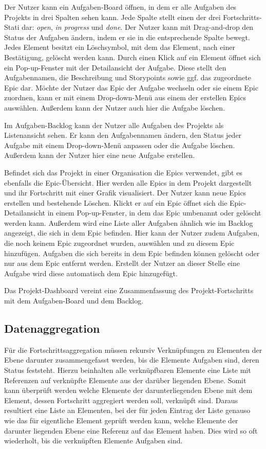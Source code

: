 Der Nutzer kann ein Aufgaben-Board öffnen, in dem er alle Aufgaben des Projekts in drei Spalten sehen kann. Jede Spalte stellt einen der drei Fortschritts-Stati dar: \emph{open}, \emph{in progress} und \emph{done}. Der Nutzer kann mit Drag-and-drop den Status der Aufgaben ändern, indem er sie in die entsprechende Spalte bewegt. Jedes Element besitzt ein Löschsymbol, mit dem das Element, nach einer Bestätigung, gelöscht werden kann. Durch einen Klick auf ein Element öffnet sich ein Pop-up-Fenster mit der Detailansicht der Aufgabe. Diese stellt den Aufgabennamen, die Beschreibung und Storypoints sowie ggf. das zugeordnete Epic dar. Möchte der Nutzer das Epic der Aufgabe wechseln oder sie einem Epic zuordnen, kann er mit einem Drop-down-Menü aus einem der erstellen Epics auswählen. Außerdem kann der Nutzer auch hier die Aufgabe löschen.

Im Aufgaben-Backlog kann der Nutzer alle Aufgaben des Projekts als Listenansicht sehen. Er kann den Aufgabennamen ändern, den Status jeder Aufgabe mit einem Drop-down-Menü anpassen oder die Aufgabe löschen. Außerdem kann der Nutzer hier eine neue Aufgabe erstellen.

Befindet sich das Projekt in einer Organisation die Epics verwendet, gibt es ebenfalls die Epic-Übersicht. Hier werden alle Epics in dem Projekt dargestellt und ihr Fortschritt mit einer Grafik visualisiert. Der Nutzer kann neue Epics erstellen und bestehende Löschen. Klickt er auf ein Epic öffnet sich die Epic-Detailansicht in einem Pop-up-Fenster, in dem das Epic umbenannt oder gelöscht werden kann. Außerdem wird eine Liste aller Aufgaben ähnlich wie im Backlog angezeigt, die sich in dem Epic befinden. Hier kann der Nutzer zudem Aufgaben, die noch keinem Epic zugeordnet wurden, auswählen und zu diesem Epic hinzufügen. Aufgaben die sich bereits in dem Epic befinden können gelöscht oder nur aus dem Epic entfernt werden. Erstellt der Nutzer an dieser Stelle eine Aufgabe wird diese automatisch dem Epic hinzugefügt.

Das Projekt-Dashboard vereint eine Zusammenfassung des Projekt-Fortschritts mit dem Aufgaben-Board und dem Backlog.

\subsection{Datenaggregation}
Für die Fortschrittsaggregation müssen rekursiv Verknüpfungen zu Elementen der Ebene darunter zusammengefasst werden, bis die Elemente Aufgaben sind, deren Status feststeht. Hierzu beinhalten alle verknüpfbaren Elemente eine Liste mit Referenzen auf verknüpfte Elemente aus der darüber liegenden Ebene. Somit kann überprüft werden welche Elemente der darunterliegenden Ebene mit dem Element, dessen Fortschritt aggregiert werden soll, verknüpft sind. Daraus resultiert eine Liste an Elementen, bei der für jeden Eintrag der Liste genauso wie das für eigentliche Element geprüft werden kann, welche Elemente der darunter liegenden Ebene eine Referenz auf das Element haben. Dies wird so oft wiederholt, bis die verknüpften Elemente Aufgaben sind.

